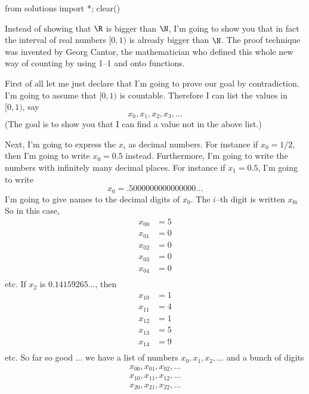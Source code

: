 \begin{python0}
from solutions import *; clear()
\end{python0}

Instead of showing that $\R$ is bigger than $\N$, I'm going to show 
you that in fact the interval of real numbers 
$[0, 1)$ is already bigger than $\N$.
The proof technique was invented by Georg Cantor, the mathematician
who defined this whole new way of counting by using 1--1 and onto functions.

First of all let me just declare that I'm going to prove our goal by 
contradiction.
I'm going to assume that $[0,1)$ is countable.
Therefore I can list the values in $[0,1)$, say
\[
x_0, x_1, x_2, x_3, \ldots
\]
(The goal
is to show you that I can find a value not in the above list.)

Next, I'm going to express the $x_i$ as decimal numbers.
For instance if $x_0 = 1/2$, then I'm going to write $x_0 = 0.5$ instead.
Furthermore, I'm going to write the numbers with infinitely many decimal
places.
For instance if $x_1 = 0.5$, I'm going to write
\[
x_0 = .5000000000000000\ldots
\]
I'm going to give names to the decimal digits of $x_0$.
The $i$--th digit is written $x_{0i}$
So in this case,
\begin{align*}
x_{00} &= 5 \\
x_{01} &= 0 \\
x_{02} &= 0 \\
x_{03} &= 0 \\
x_{04} &= 0 \\
\end{align*}
etc.
If $x_2$ is $0.14159265...$, then
\begin{align*}
x_{10} &= 1 \\
x_{11} &= 4 \\
x_{12} &= 1 \\
x_{13} &= 5 \\
x_{14} &= 9 \\
\end{align*}
etc.
So far so good ... we have a list of numbers $x_0, x_1, x_2, ...$ 
and a bunch of digits
\begin{align*}
x_{00}, x_{01}, x_{02}, ... \\
x_{10}, x_{11}, x_{12}, ... \\
x_{20}, x_{21}, x_{22}, ... \\
\end{align*}


